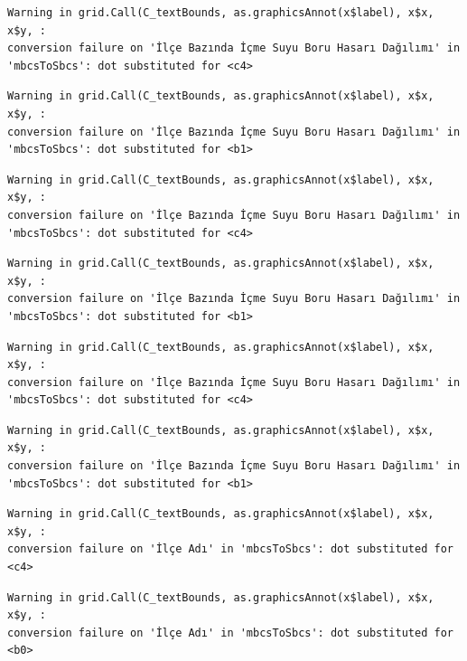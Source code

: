 \documentclass[
  11pt,
  a4paper,
  DIV=11,
  numbers=noendperiod]{scrartcl}
\begin{document}
\begin{verbatim}
Warning in grid.Call(C_textBounds, as.graphicsAnnot(x$label), x$x, x$y, :
conversion failure on 'İlçe Bazında İçme Suyu Boru Hasarı Dağılımı' in
'mbcsToSbcs': dot substituted for <c4>
\end{verbatim}

\begin{verbatim}
Warning in grid.Call(C_textBounds, as.graphicsAnnot(x$label), x$x, x$y, :
conversion failure on 'İlçe Bazında İçme Suyu Boru Hasarı Dağılımı' in
'mbcsToSbcs': dot substituted for <b1>
\end{verbatim}

\begin{verbatim}
Warning in grid.Call(C_textBounds, as.graphicsAnnot(x$label), x$x, x$y, :
conversion failure on 'İlçe Bazında İçme Suyu Boru Hasarı Dağılımı' in
'mbcsToSbcs': dot substituted for <c4>
\end{verbatim}

\begin{verbatim}
Warning in grid.Call(C_textBounds, as.graphicsAnnot(x$label), x$x, x$y, :
conversion failure on 'İlçe Bazında İçme Suyu Boru Hasarı Dağılımı' in
'mbcsToSbcs': dot substituted for <b1>
\end{verbatim}

\begin{verbatim}
Warning in grid.Call(C_textBounds, as.graphicsAnnot(x$label), x$x, x$y, :
conversion failure on 'İlçe Bazında İçme Suyu Boru Hasarı Dağılımı' in
'mbcsToSbcs': dot substituted for <c4>
\end{verbatim}

\begin{verbatim}
Warning in grid.Call(C_textBounds, as.graphicsAnnot(x$label), x$x, x$y, :
conversion failure on 'İlçe Bazında İçme Suyu Boru Hasarı Dağılımı' in
'mbcsToSbcs': dot substituted for <b1>
\end{verbatim}

\begin{verbatim}
Warning in grid.Call(C_textBounds, as.graphicsAnnot(x$label), x$x, x$y, :
conversion failure on 'İlçe Adı' in 'mbcsToSbcs': dot substituted for <c4>
\end{verbatim}

\begin{verbatim}
Warning in grid.Call(C_textBounds, as.graphicsAnnot(x$label), x$x, x$y, :
conversion failure on 'İlçe Adı' in 'mbcsToSbcs': dot substituted for <b0>
\end{verbatim}
\end{document}
